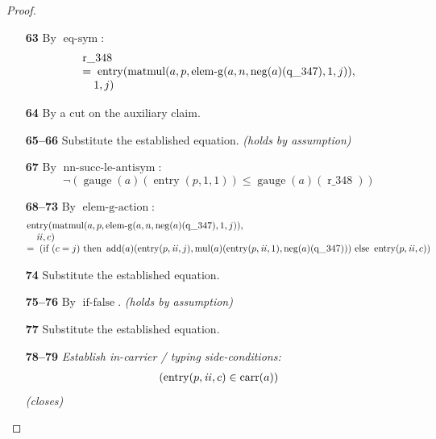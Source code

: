 \documentclass[11pt]{article}
\theoremstyle{plain}
\begin{document}
\begin{proof}
\begin{itemize}[leftmargin=2.8em, itemsep=4pt, parsep=1pt]
  \item[\textbf{63}] By $\operatorname{eq\text{-}sym}$:
\begin{equation*}
\begin{array}{@{}l@{}} \operatorname{r\_348} \\ =\; \operatorname{entry}(\operatorname{matmul}(a, p, \operatorname{elem\text{-}g}(a, n, \operatorname{neg}(a)(\operatorname{q\_347}), 1, j)), \\ \quad 1, j) \end{array}
\end{equation*}

  \item[\textbf{64}] By a cut on the auxiliary claim.
  \item[\textbf{65--66}] Substitute the established equation.  \emph{(holds by assumption)}
  \item[\textbf{67}] By $\operatorname{nn\text{-}succ\text{-}le\text{-}antisym}$:
\begin{equation*}
\neg (\operatorname{gauge}(a)(\operatorname{entry}(p, 1, 1)) \leq \operatorname{gauge}(a)(\operatorname{r\_348}))
\end{equation*}

  \item[\textbf{68--73}] By $\operatorname{elem\text{-}g\text{-}action}$:
\begin{equation*}
\begin{array}{@{}l@{}} \operatorname{entry}(\operatorname{matmul}(a, p, \operatorname{elem\text{-}g}(a, n, \operatorname{neg}(a)(\operatorname{q\_347}), 1, j)), \\ \quad \mathit{ii}, c) \\ =\; \left(\text{if }(c = j)\text{ then }\operatorname{add}(a)(\operatorname{entry}(p, \mathit{ii}, j), \operatorname{mul}(a)(\operatorname{entry}(p, \mathit{ii}, 1), \operatorname{neg}(a)(\operatorname{q\_347})))\text{ else }\operatorname{entry}(p, \mathit{ii}, c)\right) \end{array}
\end{equation*}

  \item[\textbf{74}] Substitute the established equation.
  \item[\textbf{75--76}] By $\operatorname{if\text{-}false}$.  \emph{(holds by assumption)}
  \item[\textbf{77}] Substitute the established equation.
  \item[\textbf{78--79}] \emph{Establish in-carrier / typing side-conditions:}
\begin{equation*}
\begin{array}{@{}l@{}}
(\operatorname{entry}(p, \mathit{ii}, c) \in \operatorname{carr}(a))
\end{array}
\end{equation*}
  \emph{(closes)}
\end{itemize}
\end{proof}
\end{document}
